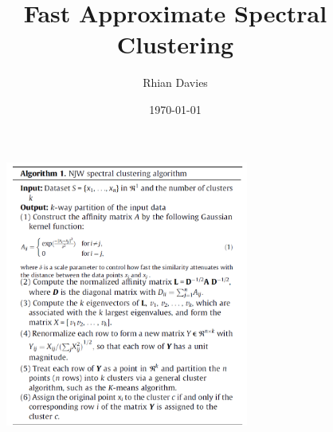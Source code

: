 \documentclass{beamer}
\begin{document}
\title{Fast Approximate Spectral Clustering}
\author{Rhian Davies}
\date{\today}

\begin{frame}[plain] 
  \titlepage
\end{frame}





\begin{frame}
\frametitle{}


\begin{figure}[h]
  \centering
  
\includegraphics[width = 8cm]{NJW}
\end{figure}


\end{frame}
\end{document}
